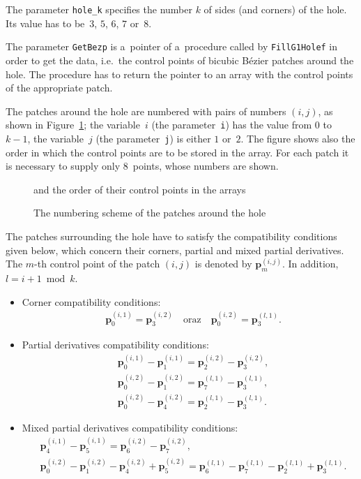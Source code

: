 The parameter \texttt{hole\_k} specifies the number $k$ of sides (and
corners) of the hole. Its value has to be~$3$, $5$, $6$, $7$ or~$8$.

The parameter \texttt{GetBezp} is a~pointer of a~procedure called by
\texttt{FillG1Holef} in order to get the data, i.e.\ the control points
of bicubic B\'{e}zier patches around the hole. The procedure has to
return the pointer to an array with the control points of the appropriate
patch.

The patches around the hole are numbered with pairs of numbers $(i,j)$,
as shown in Figure~\ref{fig:g1:patch:num:1}; the variable~$i$
(the parameter~\texttt{i}) has the value from $0$ to $k-1$, the variable~$j$
(the parameter~\texttt{j}) is either $1$ or~$2$.
The figure shows also the order in which the control points are to be
stored in the array. For each patch it is necessary to supply only $8$~points,
whose numbers are shown.
\begin{figure}[ht]
  \centerline{}
  \caption{\label{fig:g1:patch:num:1}The numbering scheme of the
    patches around the hole}
  \centerline{and the order of their control points in the arrays}
\end{figure}

The patches surrounding the hole have to satisfy the compatibility
conditions given below, which concern their corners, partial
and mixed partial derivatives. The $m$-th control point of the
patch $(i,j)$ is denoted by $\bm{p}^{(i,j)}_m$. In addition,
$l=i+1\bmod k$.
\begin{itemize}
  \item Corner compatibility conditions:
    \begin{align*}
      &{}\bm{p}^{(i,1)}_0=\bm{p}^{(i,2)}_3 \quad\mbox{oraz}\quad
      \bm{p}^{(i,2)}_0=\bm{p}^{(l,1)}_3.
    \end{align*}
  \item Partial derivatives compatibility conditions:
    \begin{align*}
      &{}\bm{p}^{(i,1)}_0-\bm{p}^{(i,1)}_1=\bm{p}^{(i,2)}_2-\bm{p}^{(i,2)}_3, \\
      &{}\bm{p}^{(i,2)}_0-\bm{p}^{(i,2)}_1=\bm{p}^{(l,1)}_7-\bm{p}^{(l,1)}_3, \\
      &{}\bm{p}^{(i,2)}_0-\bm{p}^{(i,2)}_4=\bm{p}^{(l,1)}_2-\bm{p}^{(l,1)}_3.
    \end{align*}
  \item Mixed partial derivatives compatibility conditions:
    \begin{align*}
      &{}\bm{p}^{(i,1)}_4-\bm{p}^{(i,1)}_5=\bm{p}^{(i,2)}_6-\bm{p}^{(i,2)}_7, \\
      &{}\bm{p}^{(i,2)}_0-\bm{p}^{(i,2)}_1-\bm{p}^{(i,2)}_4+\bm{p}^{(i,2)}_5=
      \bm{p}^{(l,1)}_6-\bm{p}^{(l,1)}_7-\bm{p}^{(l,1)}_2+\bm{p}^{(l,1)}_3.
    \end{align*}
\end{itemize}

